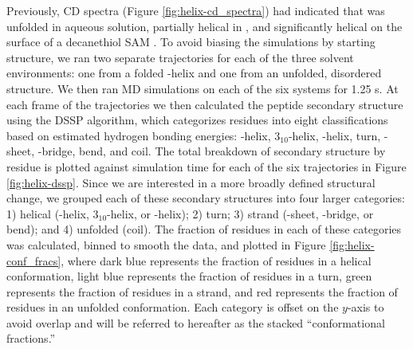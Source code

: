 Previously, CD spectra (Figure \ref{fig:helix-cd_spectra}) had indicated that \pep{} was unfolded in aqueous solution, partially helical in \tbawat{}, and significantly helical on the surface of a decanethiol SAM \cite{Gallardo2012}. 
To avoid biasing the simulations by starting structure, we ran two separate trajectories for each of the three solvent environments: one from a folded \textalpha{}-helix and one from an unfolded, disordered structure. 
We then ran MD simulations on each of the six systems for 1.25 \textmu{}s. 
At each frame of the trajectories we then calculated the peptide secondary structure using the DSSP algorithm\cite{Kabsch1983, Joosten2011}, which categorizes residues into eight classifications based on estimated hydrogen bonding energies: \textalpha{}-helix, $3_{10}$-helix, \textpi{}-helix, turn, \textbeta{}-sheet, \textbeta{}-bridge, bend, and coil. 
The total breakdown of secondary structure by residue is plotted against simulation time for each of the six trajectories in Figure \ref{fig:helix-dssp}. 
Since we are interested in a more broadly defined structural change, we grouped each of these secondary structures into four larger categories: 1) helical (\textalpha{}-helix, $3_{10}$-helix, or \textpi{}-helix); 2) turn; 3) strand (\textbeta{}-sheet, \textbeta{}-bridge, or bend); and 4) unfolded (coil). 
The fraction of residues in each of these categories was calculated, binned to smooth the data, and plotted in Figure \ref{fig:helix-conf_fracs}, where dark blue represents the fraction of residues in a helical conformation, light blue represents the fraction of residues in a turn, green represents the fraction of residues in a strand, and red represents the fraction of residues in an unfolded conformation. 
Each category is offset on the $y$-axis to avoid overlap and will be referred to hereafter as the stacked ``conformational fractions.'' 

